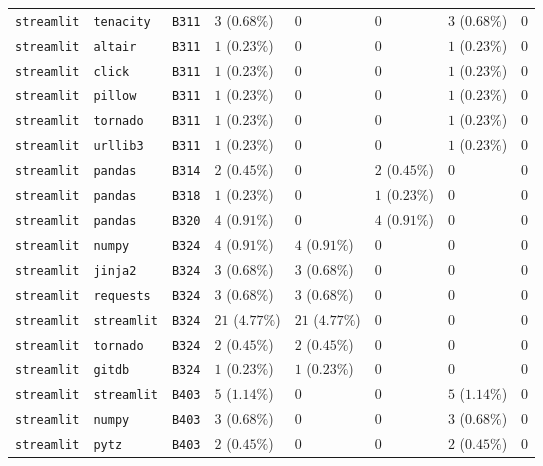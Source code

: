 \begin{table}
\begin{tabular}{llllllll}
\texttt{streamlit} & \texttt{tenacity} & \texttt{B311} & $3$ ($0.68\%$) & $0$ & $0$ & $3$ ($0.68\%$) & $0$ \\
\texttt{streamlit} & \texttt{altair} & \texttt{B311} & $1$ ($0.23\%$) & $0$ & $0$ & $1$ ($0.23\%$) & $0$ \\
\texttt{streamlit} & \texttt{click} & \texttt{B311} & $1$ ($0.23\%$) & $0$ & $0$ & $1$ ($0.23\%$) & $0$ \\
\texttt{streamlit} & \texttt{pillow} & \texttt{B311} & $1$ ($0.23\%$) & $0$ & $0$ & $1$ ($0.23\%$) & $0$ \\
\texttt{streamlit} & \texttt{tornado} & \texttt{B311} & $1$ ($0.23\%$) & $0$ & $0$ & $1$ ($0.23\%$) & $0$ \\
\texttt{streamlit} & \texttt{urllib3} & \texttt{B311} & $1$ ($0.23\%$) & $0$ & $0$ & $1$ ($0.23\%$) & $0$ \\
\texttt{streamlit} & \texttt{pandas} & \texttt{B314} & $2$ ($0.45\%$) & $0$ & $2$ ($0.45\%$) & $0$ & $0$ \\
\texttt{streamlit} & \texttt{pandas} & \texttt{B318} & $1$ ($0.23\%$) & $0$ & $1$ ($0.23\%$) & $0$ & $0$ \\
\texttt{streamlit} & \texttt{pandas} & \texttt{B320} & $4$ ($0.91\%$) & $0$ & $4$ ($0.91\%$) & $0$ & $0$ \\
\texttt{streamlit} & \texttt{numpy} & \texttt{B324} & $4$ ($0.91\%$) & $4$ ($0.91\%$) & $0$ & $0$ & $0$ \\
\texttt{streamlit} & \texttt{jinja2} & \texttt{B324} & $3$ ($0.68\%$) & $3$ ($0.68\%$) & $0$ & $0$ & $0$ \\
\texttt{streamlit} & \texttt{requests} & \texttt{B324} & $3$ ($0.68\%$) & $3$ ($0.68\%$) & $0$ & $0$ & $0$ \\
\texttt{streamlit} & \texttt{streamlit} & \texttt{B324} & $21$ ($4.77\%$) & $21$ ($4.77\%$) & $0$ & $0$ & $0$ \\
\texttt{streamlit} & \texttt{tornado} & \texttt{B324} & $2$ ($0.45\%$) & $2$ ($0.45\%$) & $0$ & $0$ & $0$ \\
\texttt{streamlit} & \texttt{gitdb} & \texttt{B324} & $1$ ($0.23\%$) & $1$ ($0.23\%$) & $0$ & $0$ & $0$ \\
\texttt{streamlit} & \texttt{streamlit} & \texttt{B403} & $5$ ($1.14\%$) & $0$ & $0$ & $5$ ($1.14\%$) & $0$ \\
\texttt{streamlit} & \texttt{numpy} & \texttt{B403} & $3$ ($0.68\%$) & $0$ & $0$ & $3$ ($0.68\%$) & $0$ \\
\texttt{streamlit} & \texttt{pytz} & \texttt{B403} & $2$ ($0.45\%$) & $0$ & $0$ & $2$ ($0.45\%$) & $0$ \\

\end{tabular}
\end{table}
